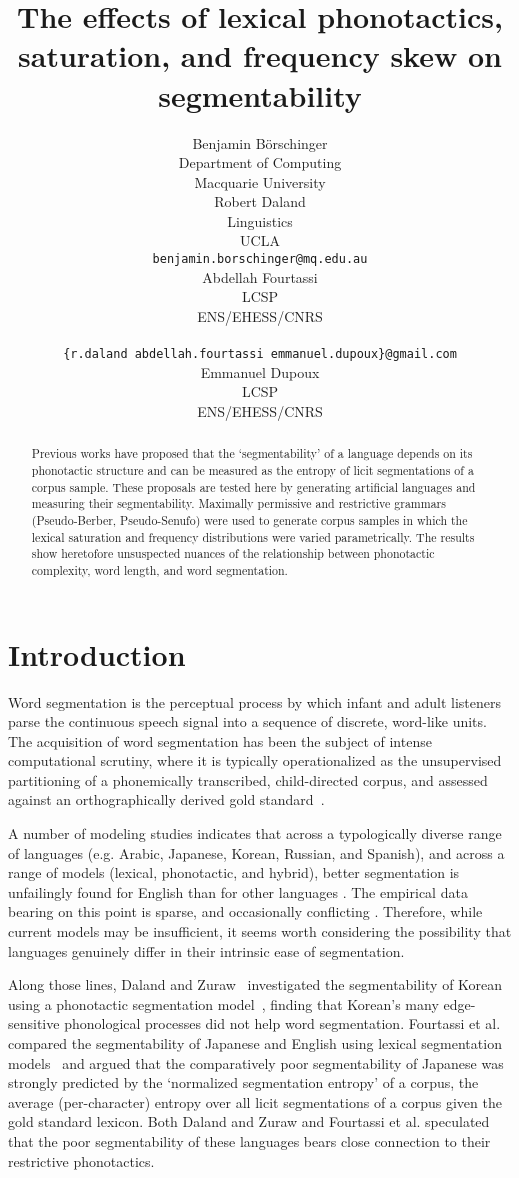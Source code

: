 \documentclass[11pt]{article}
\title{The effects of lexical phonotactics, saturation,
  and frequency skew on segmentability}
\author{Benjamin B{\"o}rschinger \\
    Department of Computing \\
    Macquarie University \\\And
  Robert Daland \\
    Linguistics \\
    UCLA \\
    {\tt benjamin.borschinger@mq.edu.au} \\\And
  Abdellah Fourtassi \\
    LCSP \\
    ENS/EHESS/CNRS \\
    \\
    {\tt \{r.daland\,abdellah.fourtassi\,emmanuel.dupoux\}@gmail.com} \\\And
  Emmanuel Dupoux \\
    LCSP \\
    ENS/EHESS/CNRS }
\date{}
\begin{document}
\maketitle
\begin{abstract}
  Previous works have proposed that the `segmentability' of a language
  depends on its phonotactic structure and can be measured as the
  entropy of licit segmentations of a corpus sample. These proposals
  are tested here by generating artificial languages and measuring
  their segmentability. Maximally permissive and restrictive grammars
  (Pseudo-Berber, Pseudo-Senufo) were used to generate corpus samples 
  in which the lexical saturation and frequency distributions were
  varied parametrically. The results show heretofore  unsuspected
  nuances of the relationship between phonotactic complexity, word
  length, and word segmentation.
\end{abstract}


\section{Introduction}

Word segmentation is the perceptual process by which infant and adult listeners parse the continuous speech signal into a sequence of discrete, word-like units. The acquisition of word segmentation has been the subject of intense computational scrutiny, where it is typically operationalized as the unsupervised partitioning of a phonemically transcribed, child-directed corpus, and assessed against an orthographically derived gold standard~\cite{Goldwater09a,Daland11a,Pearl10b}.

A number of modeling studies indicates that across a typologically diverse range of languages (e.g. Arabic, Japanese, Korean, Russian, and Spanish), and across a range of models (lexical, phonotactic, and hybrid), better segmentation is unfailingly found for English than for other languages \cite{Fleck08a,Daland09a,Daland11a,Fourtassi13a,Daland13a}. The empirical data bearing on this point is sparse, and occasionally conflicting \cite{Nazzi06a,Nazzi14a}. Therefore, while current models may be insufficient, it seems worth considering the possibility that languages genuinely differ in their intrinsic ease of segmentation.

Along those lines, Daland and Zuraw~ investigated the segmentability of Korean using a phonotactic segmentation model~\cite{Daland11a}, finding that Korean's many edge-sensitive phonological processes did not help word segmentation. Fourtassi et al.~ compared the segmentability of Japanese and English using lexical segmentation models~\cite{Goldwater09a,Johnson09a} and argued that the comparatively poor segmentability of Japanese was strongly predicted by the `normalized segmentation entropy' of a corpus, the average (per-character) entropy over all licit segmentations of a corpus given the gold standard lexicon. Both Daland and Zuraw and Fourtassi et al. speculated that the poor segmentability of these languages bears close connection to their restrictive phonotactics.
\end{document}
